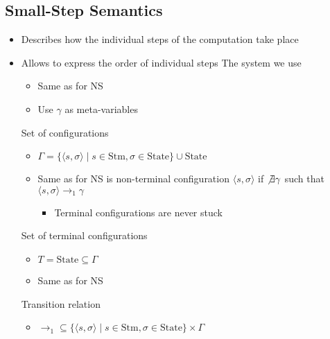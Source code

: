 \subsection{Small-Step Semantics}
\begin{itemize}
    \item Describes how the individual steps of the computation take place
    \item Allows to express the order of individual steps
     The system we use
        \begin{itemize}
                \begin{itemize}
                    \item Same as for NS
                    \item Use $\gamma$ as meta-variables
                \end{itemize}
                \begin{itemize}
                    \ides{$\mathbf{\Gamma}$:} Set of configurations
                        \begin{itemize}
                            \item $\Gamma = \{\langle s, \sigma \rangle \mid s \in \text{Stm}, \sigma \in \text{State}\} \cup \text{State}$
                            \item Same as for NS
                             is non-terminal configuration $\langle s, \sigma \rangle$ if $\not\exists \gamma$ such that $\langle s, \sigma \rangle \to_1 \gamma$
                                \begin{itemize}
                                    \item Terminal configurations are never stuck
                                \end{itemize}
                        \end{itemize}
                     Set of terminal configurations
                        \begin{itemize}
                            \item $T = \text{State} \subseteq \Gamma$
                            \item Same as for NS
                        \end{itemize}
                     Transition relation
                        \begin{itemize}
                            \item $\to_1 \subseteq \{\langle s, \sigma \rangle \mid s \in \text{Stm}, \sigma \in \text{State} \} \times \Gamma$

\end{itemize}
\end{itemize}
\end{itemize}
\end{itemize}
